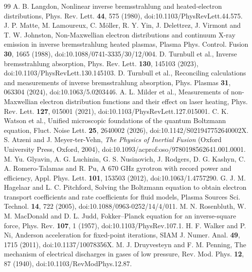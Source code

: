 \documentclass[11pt]{article}
\numberwithin{equation}{section}
\begin{document}


\raggedright
\begin{thebibliography}{99}
 A. B. Langdon, Nonlinear inverse bremsstrahlung and
heated-electron distributions, Phys. Rev. Lett. \textbf{44}, 575 (1980),
doi:10.1103/PhysRevLett.44.575.
 J. P. Matte, M. Lamoureux, C. M\"oller, R. Y. Yin,
J. Delettrez, J. Virmont and T. W. Johnston, Non-Maxwellian electron
distributions and continuum X-ray emission in inverse bremsstrahlung heated
plasmas, Plasma Phys. Control. Fusion \textbf{30}, 1665 (1988),
doi:10.1088/0741-3335/30/12/004.
 D. Turnbull et al., Inverse bremsstrahlung absorption,
Phys. Rev. Lett. \textbf{130}, 145103 (2023), doi:10.1103/PhysRevLett.130.145103.
 D. Turnbull et al., Reconciling calculations and
measurements of inverse bremsstrahlung absorption, Phys. Plasmas \textbf{31},
063304 (2024), doi:10.1063/5.0203446.
 A. L. Milder et al., Measurements of non-Maxwellian electron
distribution functions and their effect on laser heating, Phys. Rev. Lett.
\textbf{127}, 015001 (2021), doi:10.1103/PhysRevLett.127.015001.
 C. K. Watson et al., Unified microscopic foundations of the quantum
Boltzmann equation, Fluct. Noise Lett. \textbf{25}, 2640002 (2026),
doi:10.1142/S021947752640002X.
 S. Atzeni and J. Meyer-ter-Vehn, \emph{The Physics of Inertial
Fusion} (Oxford University Press, Oxford, 2004),
doi:10.1093/acprof:oso/9780198562641.001.0001.
 M. Yu. Glyavin, A. G. Luchinin, G. S. Nusinovich, J. Rodgers,
D. G. Kashyn, C. A. Romero-Talamas and R. Pu, A 670 GHz gyrotron with record power and
efficiency, Appl. Phys. Lett. \textbf{101}, 153503 (2012), doi:10.1063/1.4757290.
 G. J. M. Hagelaar and L. C. Pitchford, Solving the Boltzmann
equation to obtain electron transport coefficients and rate coefficients for fluid
models, Plasma Sources Sci. Technol. \textbf{14}, 722 (2005),
doi:10.1088/0963-0252/14/4/011.
 M. N. Rosenbluth, W. M. MacDonald and D. L. Judd,
Fokker--Planck equation for an inverse-square force, Phys. Rev. \textbf{107}, 1
(1957), doi:10.1103/PhysRev.107.1.
 H. F. Walker and P. Ni, Anderson acceleration for
fixed-point iterations, SIAM J. Numer. Anal. \textbf{49}, 1715 (2011),
doi:10.1137/10078356X.
 M. J. Druyvesteyn and F. M. Penning, The mechanism of
electrical discharges in gases of low pressure, Rev. Mod. Phys. \textbf{12}, 87
(1940), doi:10.1103/RevModPhys.12.87.

\end{thebibliography}
\end{document}
